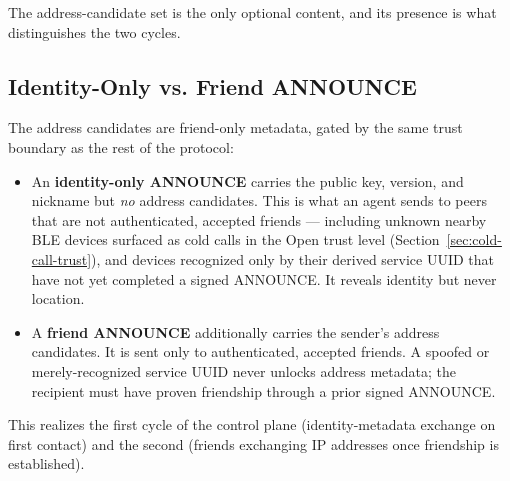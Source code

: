 The address-candidate set is the only optional content, and its presence is what distinguishes the two cycles.

\subsection{Identity-Only vs. Friend ANNOUNCE}
\label{sec:announce-variants}
The address candidates are friend-only metadata, gated by the same trust boundary as the rest of the protocol:
\begin{itemize}
\item An \textbf{identity-only ANNOUNCE} carries the public key, version, and nickname but \emph{no} address candidates. This is what an agent sends to peers that are not authenticated, accepted friends --- including unknown nearby BLE devices surfaced as cold calls in the Open trust level (Section~\ref{sec:cold-call-trust}), and devices recognized only by their derived service UUID that have not yet completed a signed ANNOUNCE. It reveals identity but never location.
\item A \textbf{friend ANNOUNCE} additionally carries the sender's address candidates. It is sent only to authenticated, accepted friends. A spoofed or merely-recognized service UUID never unlocks address metadata; the recipient must have proven friendship through a prior signed ANNOUNCE.
\end{itemize}
This realizes the first cycle of the control plane (identity-metadata exchange on first contact) and the second (friends exchanging IP addresses once friendship is established).


